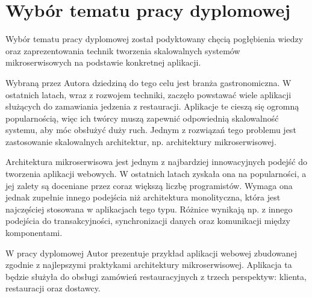 \clearpage %
\section{Wybór tematu pracy dyplomowej}

Wybór tematu pracy dyplomowej został podyktowany chęcią pogłębienia wiedzy oraz zaprezentowania technik tworzenia skalowalnych systemów mikroserwisowych na podstawie konkretnej aplikacji.

Wybraną przez Autora dziedziną do tego celu jest branża gastronomiczna. W ostatnich latach, wraz z rozwojem techniki, zaczęło powstawać wiele aplikacji służących do zamawiania jedzenia z restauracji. Aplikacje te cieszą się ogromną popularnością, więc ich twórcy muszą zapewnić odpowiednią skalowalność systemu, aby móc obsłużyć duży ruch. Jednym z rozwiązań tego problemu jest zastosowanie skalowalnych architektur, np. architektury mikroserwisowej.

Architektura mikroserwisowa jest jednym z najbardziej innowacyjnych podejść do tworzenia aplikacji webowych. W ostatnich latach zyskała ona na popularności, a jej zalety są doceniane przez coraz większą liczbę programistów. Wymaga ona jednak zupełnie innego podejścia niż architektura monolityczna, która jest najczęściej stosowana w aplikacjach tego typu. Różnice wynikają np. z innego podejścia do transakcyjności, synchronizacji danych oraz komunikacji między komponentami.

W pracy dyplomowej Autor prezentuje przykład aplikacji webowej zbudowanej zgodnie z najlepszymi praktykami architektury mikroserwisowej. Aplikacja ta będzie służyła do obsługi zamówień restauracyjnych z trzech perspektyw: klienta, restauracji oraz dostawcy.
